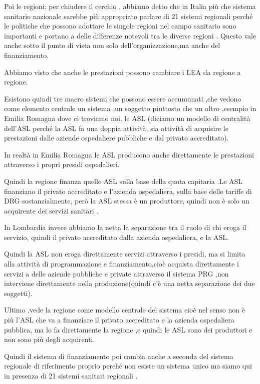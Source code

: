\documentclass[]{article}
\begin{document}
Poi le regioni: per chiudere il cerchio , abbiamo detto che in Italia
più che sistema sanitario nazionale sarebbe più appropriato parlare di
21 sistemi regionali perché le politiche che possono adottare le singole
regioni nel campo sanitario sono importanti e portano a delle differenze
notevoli tra le diverse regioni . Questo vale anche sotto il punto di
vista non solo dell'organizzazione,ma anche del finanziamento.

Abbiamo visto che anche le prestazioni possono cambiare i LEA da regione
a regione.

Esistono quindi tre macro sistemi che possono essere accumunati ,che
vedono come elemento centrale un sistema ,un soggetto piuttosto che un
altro ,esempio in Emilia Romagna dove ci troviamo noi, le ASL (diciamo
un modello di centralità dell'ASL perché la ASL fa una doppia attività,
sia attività di acquisire le prestazioni dalle aziende ospedaliere
pubbliche e dal privato accreditato).

In realtà in Emilia Romagna le ASL producono anche direttamente le
prestazioni attraverso i propri presidi ospedalieri.

Quindi la regione finanza quelle ASL sulla base della quota capitaria
.Le ASL finanziano il privato accreditato e l'azienda ospedaliera, sulla
base delle tariffe di DRG sostanzialmente, però la ASL stessa è un
produttore, quindi non è solo un acquirente dei servizi sanitari .

In Lombardia invece abbiamo la netta la separazione tra il ruolo di chi
eroga il servizio, quindi il privato accreditato dalla azienda
ospedaliera, e la ASL.

Quindi la ASL non eroga direttamente servizi attraverso i presidi, ma si
limita alla attività di programmazione e finanziamento,cioè acquista
direttamente i servizi a delle aziende pubbliche e private attraverso il
sistema PRG ,non interviene direttamente nella produzione(quindi c'è una
netta separazione dei due soggetti).

Ultimo ,vede la regione come modello centrale del sistema cioè nel senso
non è più l'ASL che va a finanziare il privato accreditato e la azienda
ospedaliera pubblica, ma lo fa direttamente la regione ,e quindi le ASL
sono dei produttori e non sono più degli acquirenti.

Quindi il sistema di finanziamento poi cambia anche a seconda del
sistema regionale di riferimento proprio perché non esiste un sistema
unico ma siamo qui in presenza di 21 sistemi sanitari regionali .
\end{document}

